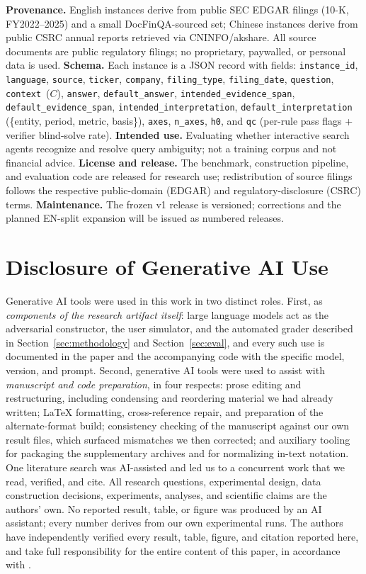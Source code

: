 \textbf{Provenance.} English instances derive from public SEC EDGAR filings
(10-K, FY2022--2025) and a small DocFinQA-sourced set; Chinese instances derive
from public CSRC annual reports retrieved via CNINFO/akshare. All source
documents are public regulatory filings; no proprietary, paywalled, or
personal data is used. \textbf{Schema.} Each instance is a JSON record with
fields: \texttt{instance\_id}, \texttt{language}, \texttt{source}, \texttt{ticker},
\texttt{company}, \texttt{filing\_type}, \texttt{filing\_date}, \texttt{question},
\texttt{context}~($C$), \texttt{answer}, \texttt{default\_answer},
\texttt{intended\_evidence\_span}, \texttt{default\_evidence\_span},
\texttt{intended\_interpretation},
\texttt{default\_interpretation}
(\{entity, period, metric, basis\}), \texttt{axes}, \texttt{n\_axes},
\texttt{h0}, and \texttt{qc} (per-rule pass flags + verifier blind-solve rate).
\textbf{Intended use.} Evaluating whether interactive search agents recognize and
resolve query ambiguity; not a training corpus and not financial advice.
\textbf{License and release.} The benchmark, construction pipeline, and evaluation
code are released for research use; redistribution of source filings follows the
respective public-domain (EDGAR) and regulatory-disclosure (CSRC) terms.
\textbf{Maintenance.} The frozen v1 release is versioned; corrections and the
planned EN-split expansion will be issued as numbered releases.

\section*{Disclosure of Generative AI Use}

Generative AI tools were used in this work in two distinct roles. First, as
\emph{components of the research artifact itself}: large language models act as the
adversarial constructor, the user simulator, and the automated grader described in
Section~\ref{sec:methodology} and Section~\ref{sec:eval}, and every such use is
documented in the paper and the accompanying code with the specific model, version,
and prompt. Second, generative AI tools were used to assist with \emph{manuscript and
code preparation}, in four respects: prose editing and restructuring, including
condensing and reordering material we had already written; \LaTeX{} formatting,
cross-reference repair, and preparation of the alternate-format build; consistency
checking of the manuscript against our own result files, which surfaced mismatches we
then corrected; and auxiliary tooling for packaging the supplementary archives and for
normalizing in-text notation. One literature search was AI-assisted and led us to a
concurrent work that we read, verified, and cite.
All research questions, experimental design, data construction decisions, experiments,
analyses, and scientific claims are the authors' own. No reported result, table, or
figure was produced by an AI assistant; every number derives from our own experimental
runs. The authors have independently verified every result, table,
figure, and citation reported here, and take full responsibility for the
entire content of this paper, in accordance with \ethicscode.
